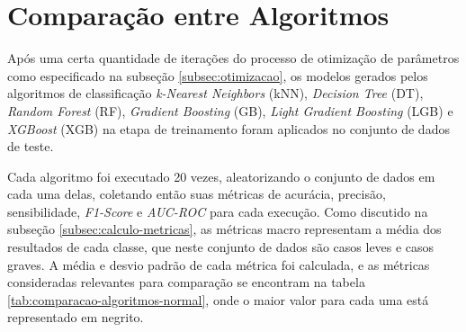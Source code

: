 \section{Comparação entre Algoritmos}
\label{sec:comparacao-algoritmos}

Após uma certa quantidade de iterações do processo de otimização de parâmetros como especificado na subseção \ref{subsec:otimizacao}, os modelos gerados pelos algoritmos de classificação \textit{k-Nearest Neighbors} (kNN), \textit{Decision Tree} (DT), \textit{Random Forest} (RF), \textit{Gradient Boosting} (GB), \textit{Light Gradient Boosting} (LGB) e \textit{XGBoost} (XGB) %
na etapa de treinamento foram aplicados no conjunto de dados de teste.

Cada algoritmo foi executado 20 vezes, aleatorizando o conjunto de dados em cada uma delas, coletando então suas métricas de acurácia, precisão, sensibilidade, \textit{F1-Score} e \textit{AUC-ROC} para cada execução. 
Como discutido na subseção \ref{subsec:calculo-metricas}, as métricas macro representam a média dos resultados de cada classe, que neste conjunto de dados são casos leves e casos graves. 
A média e desvio padrão de cada métrica foi calculada, e as métricas consideradas relevantes para comparação se encontram na tabela \ref{tab:comparacao-algoritmos-normal}, onde o maior valor para cada uma está representado em negrito.

